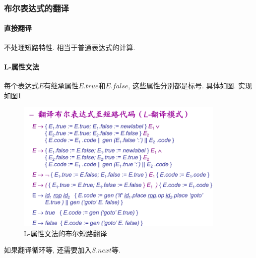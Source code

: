 \documentclass{ctexart}
\begin{document}
\subsubsection{布尔表达式的翻译}
\paragraph{直接翻译} 不处理短路特性. 相当于普通表达式的计算.
\paragraph{L-属性文法}
    每个表达式$E$有继承属性$E.true$和$E.false$, 这些属性分别都是标号. 具体如图.
    实现如图\ref{bool-1}
    \begin{figure}[ht]
    \centering
    \includegraphics[width=0.9\textwidth]{bool-1.png}
    \caption{L-属性文法的布尔短路翻译}
    \label{bool-1}
    \end{figure}
    如果翻译循环等, 还需要加入$S.next$等.
\end{document}
